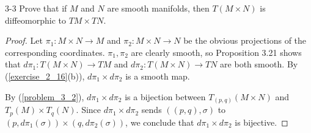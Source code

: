 \begin{customprob}{3-3}
  Prove that if $M$ and $N$ are smooth manifolds, then $T(M \times N)$ is diffeomorphic to $TM \times TN$.
\end{customprob}

\begin{proof}
  Let $\pi_1: M \times N \rightarrow M$ and $\pi_2: M \times N \rightarrow N$ be the obvious projections of the corresponding coordinates.
  $\pi_1, \pi_2$ are clearly smooth, so Proposition 3.21 shows that $d\pi_1: T(M \times N) \rightarrow TM$ and $d\pi_2: T(M \times N) \rightarrow TN$ are both smooth.
  By (\ref{exercise_2_16}(b)), $d\pi_1 \times d\pi_2$ is a smooth map.

  By (\ref{problem_3_2}), $d\pi_1 \times d\pi_2$ is a bijection between $T_{(p, q)}(M \times N)$ and $T_p(M) \times T_q(N)$.
  Since $d\pi_1 \times d\pi_2$ sends $((p, q), \sigma)$ to $(p, d\pi_1(\sigma)) \times (q, d\pi_2(\sigma))$, we conclude that $d\pi_1 \times d\pi_2$ is bijective.
\end{proof}
